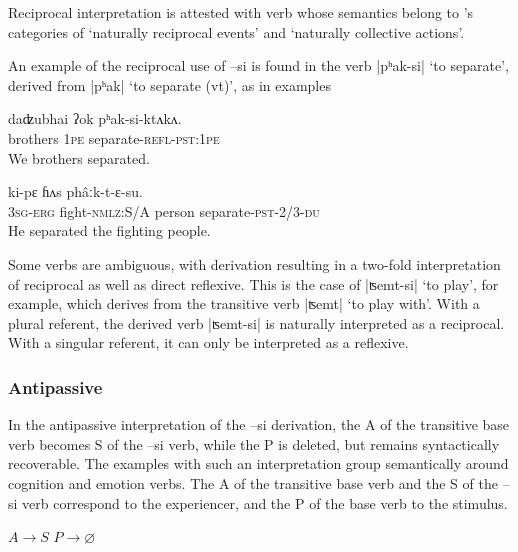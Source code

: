 \documentclass[twoside,a4paper,11pt]{article}
\newcommand{\ipa}[1]{{\phon#1}}
\begin{document}
Reciprocal interpretation is attested with verb whose semantics belong to \citet{kemmer93middle}'s categories of `naturally reciprocal events' and `naturally collective actions'.


An example of the reciprocal use of \ipa{--si} is found in the verb |\ipa{pʰak-si}| `to separate', derived from |\ipa{pʰak}| `to separate (vt)', as in examples 


\begin{exe}
\ex 
\gll 
\ipa{daʣubhai}  	\ipa{ʔok}  	\ipa{pʰak-si-ktʌkʌ.}  \\
brothers \textsc{1pe} separate-\textsc{refl-pst:1pe} \\
\glt We brothers separated.
\end{exe}

\begin{exe}
\ex 
\gll \ipa{ʔʌ̄m-ʔɛ} 	\ipa{ki-pɛ} 	\ipa{ɦʌs} 	\ipa{phâːk-t-ɛ-su.} \\ 
\textsc{3sg-erg} fight-\textsc{nmlz}:S/A person separate-\textsc{pst}-2/3-\textsc{du} \\
\glt He separated the fighting people.
\end{exe}



Some verbs are ambiguous, with derivation resulting in a two-fold interpretation of reciprocal as well as direct reflexive.  This is the case of |\ipa{ʦemt-si}| `to play', for example, which derives from the transitive verb |\ipa{ʦemt}|  `to play with'.  With a plural referent, the derived verb |\ipa{ʦemt-si}| is naturally interpreted as a reciprocal.  With a singular referent, it can only be interpreted as a reflexive.  


\subsubsection{Antipassive}
In the antipassive  interpretation of the \ipa{--si} derivation, the A of the transitive base verb becomes S of the  \ipa{--si} verb, while the P is deleted, but remains syntactically recoverable. The  examples with such an interpretation  group semantically around cognition and emotion verbs. The A of the transitive base verb and the S of the \ipa{--si} verb correspond to the experiencer, and the P of the base verb to the stimulus.

 \begin{exe}
\ex \label{ex:antipass}
\glt $A  \rightarrow S$  
\glt $P \rightarrow \varnothing  $  
\end{exe}
\end{document}
